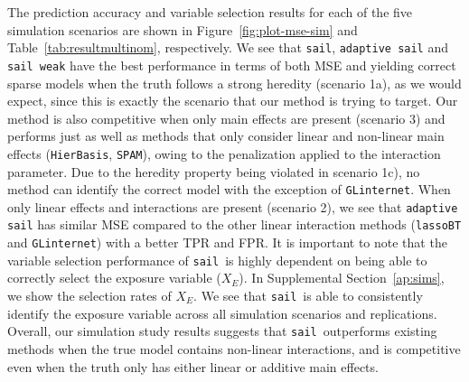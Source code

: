 \documentclass[a4paper,fleqn]{cas-sc}
\newcommand{\sail}{\texttt{sail}}
\begin{document}
The prediction accuracy and variable selection results for each of the five simulation scenarios are shown in Figure~\ref{fig:plot-mse-sim} and Table~\ref{tab:resultmultinom}, respectively. We see that \sail, \texttt{adaptive sail} and \texttt{sail weak} have the best performance in terms of both MSE and yielding correct sparse models when the truth follows a strong heredity (scenario 1a), as we would expect, since this is exactly the scenario that our method is trying to target. Our method is also competitive when only main effects are present (scenario 3) and performs just as well as methods that only consider linear and non-linear main effects (\texttt{HierBasis}, \texttt{SPAM}), owing to the penalization applied to the interaction parameter. Due to the heredity property being violated in scenario 1c), no method can identify the correct model with the exception of \texttt{GLinternet}. When only linear effects and interactions are present (scenario 2), we see that \texttt{adaptive sail} has similar MSE compared to the other linear interaction methods (\texttt{lassoBT} and \texttt{GLinternet}) with a better TPR and FPR. It is important to note that the variable selection performance of \sail ~is highly dependent on being able to correctly select the exposure variable ($X_E$). In Supplemental Section~\ref{ap:sims}, we show the selection rates of $X_E$. We see that \sail ~is able to consistently identify the exposure variable across all simulation scenarios and replications. Overall, our simulation study results suggests that \sail ~outperforms existing methods when the true model contains non-linear interactions, and is competitive even when the truth only has either linear or additive main effects. 
\end{document}

